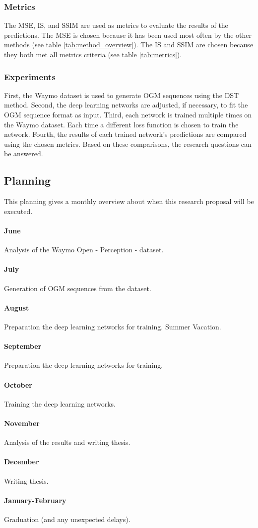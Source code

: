 \subsubsection{Metrics} 
The \gls{MSE}, \gls{IS}, and \gls{SSIM} are used as metrics to evaluate the results of the predictions. The \gls{MSE} is chosen because it has been used most often by the other methods (see table \ref{tab:method_overview}). The \gls{IS} and \gls{SSIM} are chosen because they both met all metrics criteria (see table \ref{tab:metrics}). 

\subsubsection{Experiments}
First, the Waymo \cite{sun2020scalability} dataset is used to generate \gls{OGM} sequences using the \gls{DST} method. Second, the deep learning networks are adjusted, if necessary, to fit the \gls{OGM} sequence format as input. Third, each network is trained multiple times on the Waymo \cite{sun2020scalability} dataset. Each time a different loss function is chosen to train the network. Fourth, the results of each trained network's predictions are compared using the chosen metrics. Based on these comparisons, the research questions can be answered. 

\subsection{Planning} \label{subsec:rp_planning}
This planning gives a monthly overview about when this research proposal will be executed. 

\paragraph{June} Analysis of the Waymo Open - Perception - \cite{sun2020scalability} dataset.
\paragraph{July} Generation of \gls{OGM} sequences from the dataset.
\paragraph{August} Preparation the deep learning networks for training. Summer Vacation.
\paragraph{September} Preparation the deep learning networks for training.
\paragraph{October} Training the deep learning networks.
\paragraph{November} Analysis of the results and writing thesis. 
\paragraph{December} Writing thesis.
\paragraph{January-February} Graduation (and any unexpected delays).


